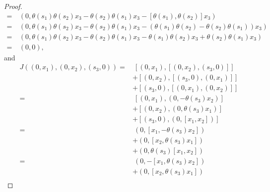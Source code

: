 \documentclass[12pt]{article}
\theoremstyle{definition}
\begin{document}
\begin{proof}
\begin{align*}
		=                                 & \ (0, \theta(s_1)\theta(s_2)x_3 - \theta(s_2)\theta(s_1)x_3 - [\theta(s_1), \theta(s_2)]x_3)                         \\
		=                                 & \ (0, \theta(s_1)\theta(s_2)x_3 - \theta(s_2)\theta(s_1)x_3 - (\theta(s_1)\theta(s_2) - \theta(s_2)\theta(s_1))x_3)  \\
		=                                 & \ (0, \theta(s_1)\theta(s_2)x_3 - \theta(s_2)\theta(s_1)x_3 - \theta(s_1)\theta(s_2)x_3 + \theta(s_2)\theta(s_1)x_3) \\
		=                                 & \ (0, 0),
	\end{align*}
	and \begin{align*}
		J((0, x_1), (0, x_2), (s_3, 0)) = & \ [(0, x_1), [(0, x_2), (s_3, 0)]]                                                                    \\
		                                  & + [(0, x_2), [(s_3, 0), (0, x_1)]]                                                                    \\
		                                  & + [(s_3, 0), [(0, x_1), (0, x_2)]]                                                                    \\
		=                                 & \ [(0, x_1), (0, -\theta(s_3)x_2)]                                                                    \\
		                                  & + [(0, x_2), (0, \theta(s_3)x_1)]                                                                     \\
		                                  & + [(s_3, 0), (0, [x_1, x_2])]                                                                         \\
		=                                 & \ (0, [x_1, -\theta(s_3)x_2])                                                                         \\
		                                  & + (0, [x_2, \theta(s_3)x_1])                                                                          \\
		                                  & + (0, \theta(s_3)[x_1,x_2])                                                                           \\
		=                                 & \ (0, -[x_1, \theta(s_3)x_2])                                                                         \\
		                                  & + (0, [x_2, \theta(s_3)x_1])                                                                          \\

\end{align*}
\end{proof}
\end{document}

